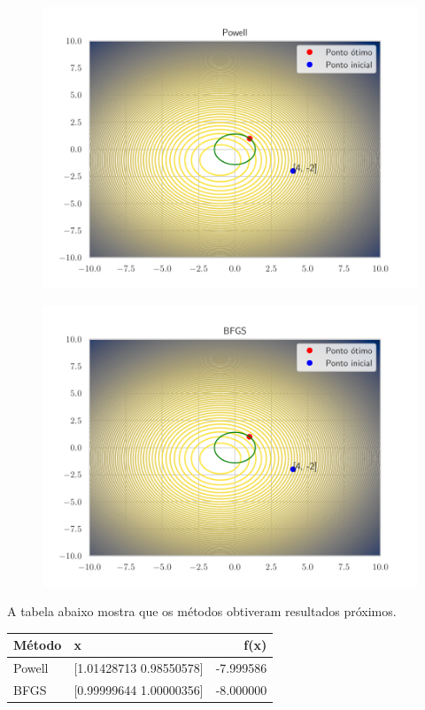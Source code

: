 \documentclass[12pt]{article}
\begin{document}
\begin{figure}[H]
  \centering
  \includegraphics[scale = 0.6]{problema_2_penalidade_Powell_[ 4 -2].pdf}
\end{figure}

\begin{figure}[H]
  \centering
  \includegraphics[scale = 0.6]{problema_2_penalidade_BFGS_[ 4 -2].pdf}
\end{figure}

A tabela abaixo mostra que os métodos obtiveram resultados próximos.

\begin{table}[H]
\centering
\begin{tabular}{llr}
  \hline
  Método & x & f(x) \\
  \hline
  Powell & [1.01428713 0.98550578] & -7.999586 \\
  BFGS & [0.99999644 1.00000356] & -8.000000 \\
  \hline
  \end{tabular}
\end{table}
\end{document}
